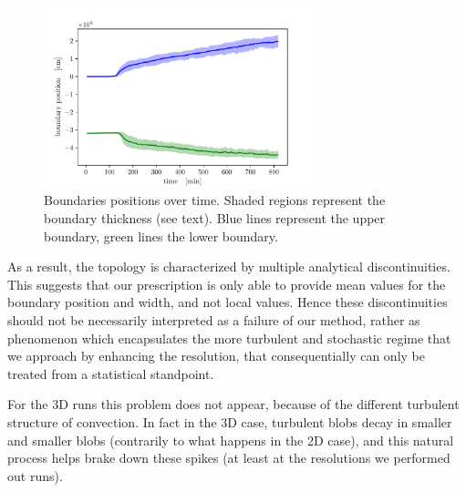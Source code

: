 \begin{figure}[b!]
\centering
\includegraphics[width=0.7\textwidth]{./img/boundpos.pdf}
\caption{Boundaries positions over time. Shaded regions represent the boundary thickness (see text). Blue lines represent the upper boundary, green lines the lower boundary.}
\label{fig:boundpos}
\end{figure}
As a result, the topology is characterized by multiple analytical discontinuities. This suggests that our prescription is only able to provide mean values for the boundary position and width, and not local values. Hence these discontinuities should not be necessarily interpreted as a failure of our method, rather as phenomenon which encapsulates the more turbulent and stochastic regime that we approach by enhancing the resolution, that consequentially can only be treated from a statistical standpoint.

For the 3D runs this problem does not appear, because of the different turbulent structure of convection. In fact in the 3D case, turbulent blobs decay in smaller and smaller blobs (contrarily to what happens in the 2D case), and this natural process helps brake down these spikes (at least at the resolutions we performed out runs).


